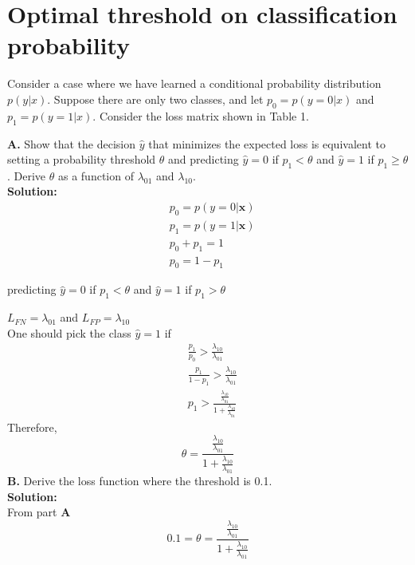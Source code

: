 \documentclass{article}
\begin{document}
\newpage
\section{Optimal threshold on classification probability}
Consider a case where we have learned a conditional probability distribution $p(y|x)$. Suppose there are only two classes, and let $p_{0} = p(y=0|x)$ and $p_{1} = p(y=1|x)$. Consider the loss matrix shown in Table 1.

\textbf{A. } Show that the decision $\hat{y}$ that minimizes the expected loss is equivalent to setting a probability threshold $\theta$ and predicting $\hat{y} =0$ if $p_{1} < \theta$ and $\hat{y} = 1$ if $p_{1} \geq \theta$. Derive $\theta$ as a function of $\lambda_{01}$ and $\lambda_{10}$.\\
\textbf{Solution:}\\
\begin{equation}
\begin{aligned}
& p_0 = p(y=0|\mathbf{x}) \\
& p_1 = p(y=1|\mathbf{x}) \\
& p_0 + p_1 = 1 \\
& p_0 = 1-p_1
\end{aligned}
\end{equation}

predicting $\hat{y} = 0$ if $p_1 <\theta$ and $\hat{y} = 1$ if $p_1 >\theta$ 

$L_{FN} = \lambda_{01}$ and $L_{FP} = \lambda_{10}$ \\
One should pick the class $\hat{y}=1$ if 
\begin{equation}
\begin{aligned}
& \frac{p_1}{p_0} > \frac{ \lambda_{10}}{\lambda_{01}} \\
& \frac{p_1}{1-p_1} > \frac{ \lambda_{10}}{\lambda_{01}} \\
& p_1 > \frac{\frac{\lambda_{10}}{\lambda_{01}}}{1+ \frac{\lambda_{10}}{\lambda_{01}}}
\end{aligned}
\end{equation}
Therefore,
\begin{equation}
    \theta =  \frac{\frac{\lambda_{10}}{\lambda_{01}}}{1+ \frac{\lambda_{10}}{\lambda_{01}}}
\end{equation}
\textbf{B. } Derive the loss function where the threshold is 0.1. \\
\textbf{Solution:} \\
From part \textbf{A}
\begin{equation}
    0.1 = \theta =  \frac{\frac{\lambda_{10}}{\lambda_{01}}}{1+ \frac{\lambda_{10}}{\lambda_{01}}}
\end{equation}\\
\end{document}
